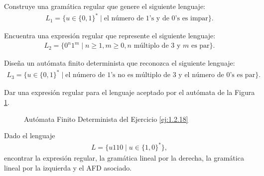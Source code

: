 \begin{ejercicio}
    Construye una gramática regular que genere el siguiente lenguaje:
    \begin{align*}
        L_1 = \{u \in \{0, 1\}^* \mid \text{el número de $1$'s y de $0$'s es impar}\}.
    \end{align*}
\end{ejercicio}

\begin{ejercicio}
    Encuentra una expresión regular que represente el siguiente lenguaje:
    \begin{align*}
        L_2 = \{0^n1^m \mid n \geq 1, m \geq 0, n \text{ múltiplo de } 3 \text{ y } m \text{ es par}\}.
    \end{align*}
\end{ejercicio}

\begin{ejercicio}
    Diseña un autómata finito determinista que reconozca el siguiente lenguaje:
    \begin{align*}
        L_3 = \{u \in \{0, 1\}^* \mid \text{el número de $1$'s no es múltiplo de } 3 \text{ y el número de $0$'s es par}\}.
    \end{align*}
\end{ejercicio}

\begin{ejercicio} \label{ej:1.2.18}
    Dar una expresión regular para el lenguaje aceptado por el autómata de la Figura \ref{fig:ej:1.2.18}.
    \begin{figure}
        \centering
        \caption{Autómata Finito Determinista del Ejercicio \ref{ej:1.2.18}}
        \label{fig:ej:1.2.18}
    \end{figure}
\end{ejercicio}


\begin{ejercicio} \label{ej:1.2.19}
    Dado el lenguaje
    \begin{align*}
        L = \{u110 \mid u \in \{1, 0\}^*\},
    \end{align*}
    encontrar la expresión regular, la gramática lineal por la derecha, la gramática lineal por la izquierda y el AFD asociado.
\end{ejercicio}


